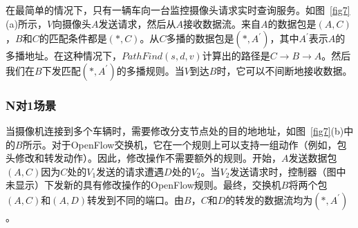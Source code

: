 \documentclass{ctexart}
\begin{document}
在最简单的情况下，只有一辆车向一台监控摄像头请求实时查询服务。如图~\ref{fig7}(a)所示，$V$向摄像头$A$发送请求，然后从$A$接收数据流。来自$A$的数据包是$(A,C)$，$B$和$C$的匹配条件都是$(*,C)$。从$C$多播的数据包是$(*, A^{'})$，其中$A^{'}$表示$A$的多播地址。在这种情况下，$PathFind(s,d,v)$计算出的路径是$C \to B \to A$。然后我们在$B$下发匹配$(*,A^{'})$的多播规则。当$V$到达$B$时，它可以不间断地接收数据。
%


\subsubsection{N对1场景} \label{N to 1}

当摄像机连接到多个车辆时，需要修改分支节点处的目的地地址，如图~\ref{fig7}(b)中的$B$所示。对于OpenFlow交换机，它在一个规则上可以支持一组动作（例如，包头修改和转发动作）。因此，修改操作不需要额外的规则。开始，$A$发送数据包$(A, C)$因为$C$处的$V_{1}$发送的请求遭遇$D$处的$V_{2}$。当$V_{2}$发送请求时，控制器（图中未显示）下发新的具有修改操作的OpenFlow规则。最终，交换机$B$将两个包$(A, C)$和$(A, D)$转发到不同的端口。由$B$，$C$和$D$的转发的数据流均为$(*, A^{'})$。


\end{document}
